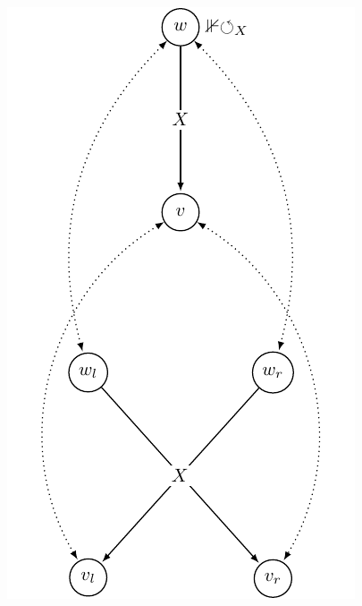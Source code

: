 \begin{figure}[ht]
{\includegraphics[height=.4\textheight]{evil_pictures/bisim2.pdf}
\label{fig:bisim2}
} 
\end{figure}
